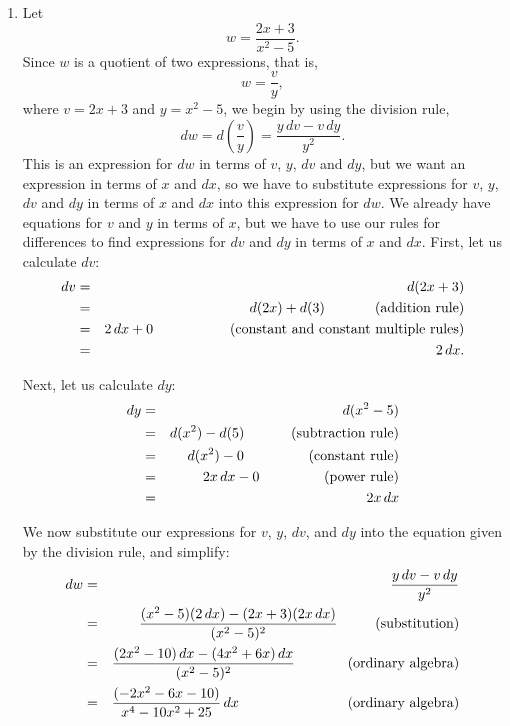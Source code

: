 \documentclass[polutonikogreek,english,twoside,openright]{article}
\begin{document}
\begin{enumerate}
\item 
Let 
$$w = \frac{2x + 3}{x^2 - 5}.$$
Since $w$ is a quotient of two expressions, that is, 
$$w = \frac{v}{y},$$
where $v= 2x+3$ and $y = x^2 - 5$, we begin by using the division rule,
$$ dw = d\left(\frac{v}{y}\right) = \frac{y\,dv - v\,dy}{y^2}.$$
This is an expression for $dw$ in terms of $v$, $y$, $dv$ and $dy$,
but we want an expression in terms of $x$ and $dx$, so we have to
substitute expressions for $v$, $y$, $dv$ and $dy$ in terms of $x$ and
$dx$ into this expression for $dw$.  We already have equations for $v$
and $y$ in terms of $x$, but we have to use our rules for differences
to find expressions for $dv$ and $dy$ in terms of $x$ and $dx$.
First, let us calculate $dv$:
\begin{eqnarray*}
dv & = & d(2x + 3) \\
 & = & d(2x) + d(3) \mbox{\hspace{7.55ex} (addition rule)}\\
 & = & 2\,dx + 0 \mbox{\hspace{12ex} (constant and constant multiple rules)}\\
 & = & 2\,dx.
 \end{eqnarray*}
 
 Next, let us calculate $dy$:
 \begin{eqnarray*}
dy & = & d(x^2 - 5) \\
 & = & d(x^2) - d(5)  \mbox{\hspace{7ex} (subtraction rule)}\\
 & = & d(x^2) - 0 \mbox{\hspace{10ex} (constant rule)}\\
 & = & 2x\,dx -0 \mbox{\hspace{10ex} (power rule)}\\
 & = & 2x\,dx
 \end{eqnarray*}
 
 We now substitute our expressions for $v$, $y$, $dv$, and $dy$ into the equation given by the division rule, and simplify:
\begin{eqnarray*}
dw &  =  &  \frac{y\,dv - v\,dy}{y^2} \\
& = & \frac{(x^2-5)(2\,dx) - (2x+3)(2x\,dx)}{(x^2 - 5)^2} \mbox{\hspace{5.5ex} (substitution)}\\
& = & \frac{(2x^2 -10)\,dx - (4x^2 + 6x)\,dx}{(x^2 - 5)^2} \mbox{\hspace{8ex} (ordinary algebra)}\\
& = & \frac{(-2x^2 - 6x -10)}{x^4 -10x^2 + 25}\,dx \mbox{\hspace{18.1ex}(ordinary algebra)}
\end{eqnarray*}


\end{enumerate}
\end{document}
